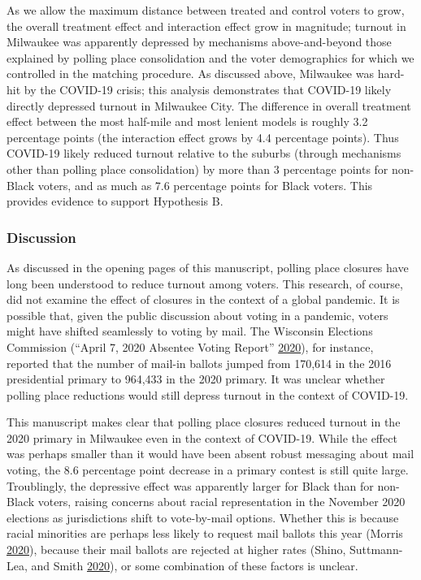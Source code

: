 \documentclass[
  12pt,
]{article}
\begin{document}
As we allow the maximum distance between treated and control voters to grow, the overall treatment effect and interaction effect grow in magnitude; turnout in Milwaukee was apparently depressed by mechanisms above-and-beyond those explained by polling place consolidation and the voter demographics for which we controlled in the matching procedure. As discussed above, Milwaukee was hard-hit by the COVID-19 crisis; this analysis demonstrates that COVID-19 likely directly depressed turnout in Milwaukee City. The difference in overall treatment effect between the most half-mile and most lenient models is roughly 3.2 percentage points (the interaction effect grows by 4.4 percentage points). Thus COVID-19 likely reduced turnout relative to the suburbs (through mechanisms other than polling place consolidation) by more than 3 percentage points for non-Black voters, and as much as 7.6 percentage points for Black voters. This provides evidence to support Hypothesis B.

\hypertarget{discussion}{%
\subsubsection*{Discussion}\label{discussion}}

As discussed in the opening pages of this manuscript, polling place closures have long been understood to reduce turnout among voters. This research, of course, did not examine the effect of closures in the context of a global pandemic. It is possible that, given the public discussion about voting in a pandemic, voters might have shifted seamlessly to voting by mail. The Wisconsin Elections Commission (``April 7, 2020 Absentee Voting Report'' \protect\hyperlink{ref-wec2020}{2020}), for instance, reported that the number of mail-in ballots jumped from 170,614 in the 2016 presidential primary to 964,433 in the 2020 primary. It was unclear whether polling place reductions would still depress turnout in the context of COVID-19.

This manuscript makes clear that polling place closures reduced turnout in the 2020 primary in Milwaukee even in the context of COVID-19. While the effect was perhaps smaller than it would have been absent robust messaging about mail voting, the 8.6 percentage point decrease in a primary contest is still quite large. Troublingly, the depressive effect was apparently larger for Black than for non-Black voters, raising concerns about racial representation in the November 2020 elections as jurisdictions shift to vote-by-mail options. Whether this is because racial minorities are perhaps less likely to request mail ballots this year (Morris \protect\hyperlink{ref-Morris2020}{2020}), because their mail ballots are rejected at higher rates (Shino, Suttmann-Lea, and Smith \protect\hyperlink{ref-Shino2020}{2020}), or some combination of these factors is unclear.
\end{document}
